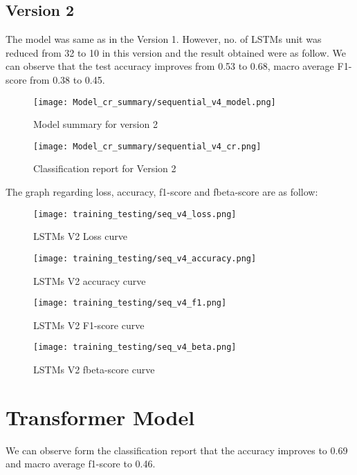 \subsection{Version 2}
The model was same as in the Version 1. However, no. of LSTMs unit was reduced from 32 to 10 in this version and the result obtained were as follow. We can observe that the test accuracy improves from 0.53 to 0.68, macro average F1-score from 0.38 to 0.45.

\begin{figure}[H]
    \centering
    \texttt{[image: Model\_cr\_summary/sequential\_v4\_model.png]}
    \caption{Model summary for version 2}
    \label{fig:Model summary for version 2}
\end{figure}

\begin{figure}[H]
    \centering
    \texttt{[image: Model\_cr\_summary/sequential\_v4\_cr.png]}
    \caption{Classification report for Version 2}
    \label{fig: Classification report for Version 2}
\end{figure}

The graph regarding loss, accuracy, f1-score and fbeta-score are as follow:

\begin{figure}[H]
    \centering
    \texttt{[image: training\_testing/seq\_v4\_loss.png]}
    \caption{LSTMs V2 Loss curve}
    \label{fig:LSTMs V2 loss curve}
\end{figure}

\begin{figure}[H]
    \centering
    \texttt{[image: training\_testing/seq\_v4\_accuracy.png]}
    \caption{LSTMs V2 accuracy curve}
    \label{fig:LSTMs V2 accuracy curve}
\end{figure}

\begin{figure}[H]
    \centering
    \texttt{[image: training\_testing/seq\_v4\_f1.png]}
    \caption{LSTMs V2 F1-score curve}
    \label{fig:LSTMs V2 F1-score curve}
\end{figure}

\begin{figure}[H]
    \centering
    \texttt{[image: training\_testing/seq\_v4\_beta.png]}
    \caption{LSTMs V2 fbeta-score curve}
    \label{fig:LSTMs V2 fbeta-score curve}
\end{figure}

\section{Transformer Model}
We can observe form the classification report that the accuracy improves to 0.69 and macro average f1-score to 0.46.

